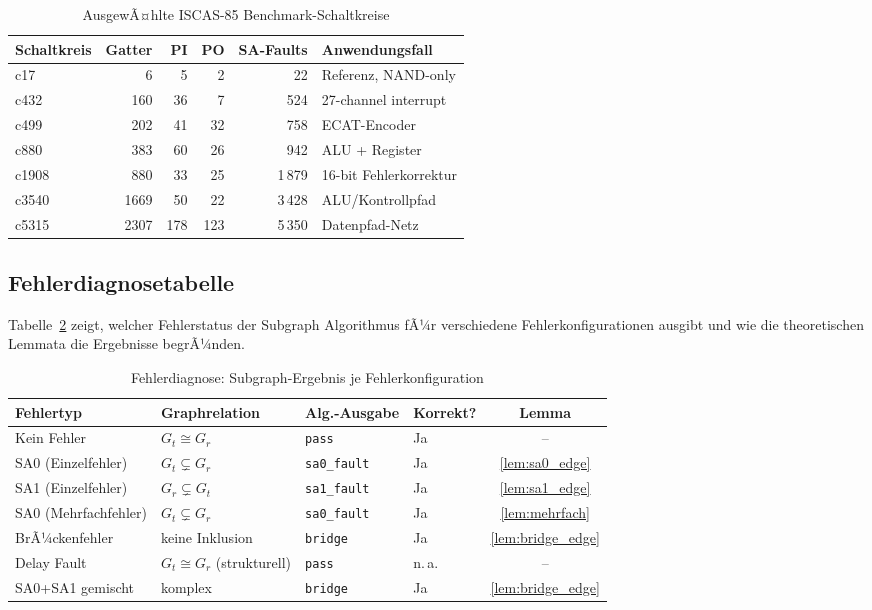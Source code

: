 ﻿\documentclass[a4paper,12pt]{article}
\theoremstyle{definition}
\begin{document}
\begin{table}[ht]
  \centering
  \caption{AusgewÃ¤hlte ISCAS-85 Benchmark-Schaltkreise}
  \label{tab:iscas}
  \begin{tabular}{lrrrrl}
    \toprule
    \textbf{Schaltkreis} & \textbf{Gatter}
      & \textbf{PI} & \textbf{PO}
      & \textbf{SA-Faults} & \textbf{Anwendungsfall} \\
    \midrule
    c17   &    6 &  5 &  2 &    22 & Referenz, NAND-only \\
    c432  &  160 & 36 &  7 &   524 & 27-channel interrupt \\
    c499  &  202 & 41 & 32 &   758 & ECAT-Encoder \\
    c880  &  383 & 60 & 26 &   942 & ALU + Register \\
    c1908 &  880 & 33 & 25 & 1\,879 & 16-bit Fehlerkorrektur \\
    c3540 & 1669 & 50 & 22 & 3\,428 & ALU/Kontrollpfad \\
    c5315 & 2307 & 178& 123& 5\,350 & Datenpfad-Netz \\
    \bottomrule
  \end{tabular}
\end{table}

\subsection{Fehlerdiagnosetabelle}

Tabelle~\ref{tab:diagnose} zeigt, welcher Fehlerstatus der
Subgraph Algorithmus fÃ¼r verschiedene Fehlerkonfigurationen ausgibt
und wie die theoretischen Lemmata die Ergebnisse begrÃ¼nden.

\begin{table}[ht]
  \centering
  \caption{Fehlerdiagnose: Subgraph-Ergebnis je Fehlerkonfiguration}
  \label{tab:diagnose}
  \small
  \begin{tabular}{@{}llllc@{}}
    \toprule
    \textbf{Fehlertyp} & \textbf{Graphrelation}
      & \textbf{Alg.-Ausgabe} & \textbf{Korrekt?}
      & \textbf{Lemma} \\
    \midrule
    Kein Fehler
      & $G_t \cong G_r$
      & \texttt{pass}
      & Ja & -- \\
    SA0 (Einzelfehler)
      & $G_t \subsetneq G_r$
      & \texttt{sa0\_fault}
      & Ja & \ref{lem:sa0_edge} \\
    SA1 (Einzelfehler)
      & $G_r \subsetneq G_t$
      & \texttt{sa1\_fault}
      & Ja & \ref{lem:sa1_edge} \\
    SA0 (Mehrfachfehler)
      & $G_t \subsetneq G_r$
      & \texttt{sa0\_fault}
      & Ja & \ref{lem:mehrfach} \\
    BrÃ¼ckenfehler
      & keine Inklusion
      & \texttt{bridge}
      & Ja & \ref{lem:bridge_edge} \\
    Delay Fault
      & $G_t \cong G_r$ (strukturell)
      & \texttt{pass}
      & n.\,a. & -- \\
    SA0+SA1 gemischt
      & komplex
      & \texttt{bridge}
      & Ja & \ref{lem:bridge_edge} \\
    \bottomrule
  \end{tabular}
\end{table}
\end{document}
